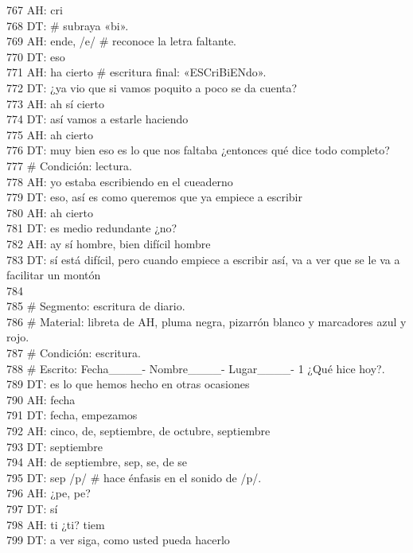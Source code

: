 767 AH: cri\\
768 DT: \# subraya «bi».\\
769 AH: ende, /e/ \# reconoce la letra faltante.\\
770 DT: eso\\
771 AH: ha cierto \# escritura final: «ESCriBiENdo».\\
772 DT: ¿ya vio que si vamos poquito a poco se da cuenta?\\
773 AH: ah sí cierto\\
774 DT: así vamos a estarle haciendo\\
775 AH: ah cierto\\
776 DT: muy bien eso es lo que nos faltaba ¿entonces qué dice todo completo?\\
777 \# Condición: lectura.\\
778 AH: yo estaba escribiendo en el cueaderno\\
779 DT: eso, así es como queremos que ya empiece a escribir\\
780 AH: ah cierto\\
781 DT: es medio redundante ¿no?\\
782 AH: ay sí hombre, bien difícil hombre\\
783 DT: sí está difícil, pero cuando empiece a escribir así, va a ver que se le va a facilitar un montón\\
784 \\
785 \# Segmento: escritura de diario.\\
786 \# Material: libreta de AH, pluma negra, pizarrón blanco y marcadores azul y rojo.\\
787 \# Condición: escritura.\\
788 \# Escrito: Fecha\_\_\_\_- Nombre\_\_\_\_- Lugar\_\_\_\_- 1 ¿Qué hice hoy?.\\
789 DT: es lo que hemos hecho en otras ocasiones\\
790 AH: fecha\\
791 DT: fecha, empezamos\\
792 AH: cinco, de, septiembre, de octubre, septiembre\\
793 DT: septiembre\\
794 AH: de septiembre, sep, se, de se\\
795 DT: sep /p/ \# hace énfasis en el sonido de /p/.\\
796 AH: ¿pe, pe?\\
797 DT: sí\\
798 AH: ti ¿ti? tiem\\
799 DT: a ver siga, como usted pueda hacerlo\\

